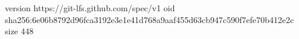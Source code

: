 version https://git-lfs.github.com/spec/v1
oid sha256:6e06b8792d96fca3192e3e1e41d768a9aaf455d63cb947c590f7efe70b412e2c
size 448
